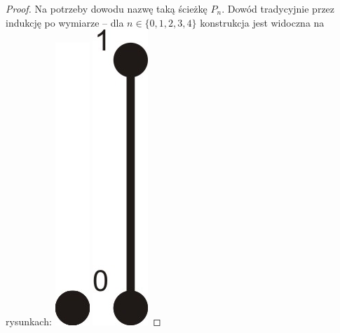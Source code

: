 \documentclass{pracamgr}
\begin{document}
    \begin{proof}%
     Na potrzeby dowodu nazwę taką ścieżkę $P_n$.
     Dowód tradycyjnie przez indukcję po wymiarze -- dla $n\in\{0,1,2,3,4\}$ konstrukcja jest widoczna na rysunkach:\newline
     \hspace*{0pt}\includegraphics[scale=0.6]{img/Q0_long_path.jpg}
     \hspace*{12pt}\includegraphics[scale=0.6]{img/Q1_long_path.jpg}

\end{proof}
\end{document}
